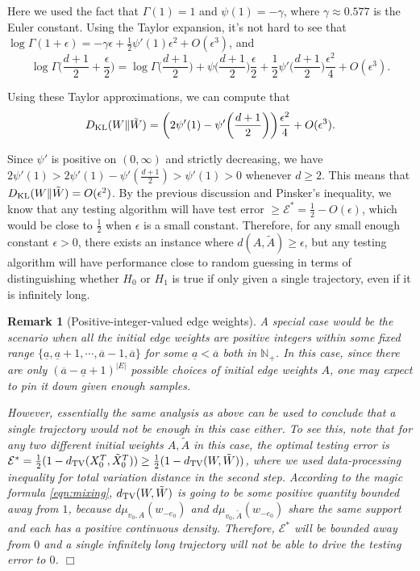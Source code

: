 \documentclass[a4paper, 11pt]{article}
\newcommand{\dkl}{D_{\textnormal{KL}}}
\newcommand{\dtv}{d_{\textnormal{TV}}}
\newtheorem{remark}{Remark}
\begin{document}
Here we used the fact that $\Gamma(1)=1$ and $\psi(1)=-\gamma$, where $\gamma\approx 0.577$ is the Euler constant. Using the Taylor expansion, it's not hard to see that $\log\Gamma(1+\epsilon)=-\gamma \epsilon+\frac{1}{2}\psi'(1)\epsilon^2+O(\epsilon^3)$, and
\[\log\Gamma\Big(\frac{d+1}{2}+\frac{\epsilon}{2}\Big)=\log\Gamma\Big(\frac{d+1}{2}\Big)+\psi\Big(\frac{d+1}{2}\Big) \frac{\epsilon}{2} + \frac{1}{2}\psi'\Big(\frac{d+1}{2}\Big) \frac{\epsilon^2}{4} +O(\epsilon^3).\]

Using these Taylor approximations, we can compute that
\[\dkl(W\|\tilde{W})
= \bigg(2\psi'(1)-\psi'\bigg(\frac{d+1}{2}\bigg)\bigg)\frac{\epsilon^2}{4}+O(\epsilon^3).\]

Since $\psi'$ is positive on $(0,\infty)$ and strictly decreasing, we have $2\psi'(1)> 2\psi'(1)-\psi'(\frac{d+1}{2})> \psi'(1)>0$ whenever $d\geq 2$. This means that $\dkl(W\|\tilde{W})= O(\epsilon^2)$. By the previous discussion and Pinsker's inequality, we know that any testing algorithm will have test error $\geq \mathcal{E}^*= \frac{1}{2}-O(\epsilon)$, which would be close to $\frac{1}{2}$ when $\epsilon$ is a small constant. Therefore, for any small enough constant $\epsilon>0$, there exists an instance where $d(A,\tilde{A})\geq \epsilon$, but any testing algorithm will have performance close to random guessing in terms of distinguishing whether $H_0$ or $H_1$ is true if only given a single trajectory, even if it is infinitely long.

\begin{remark}[Positive-integer-valued edge weights]
A special case would be the scenario when all the initial edge weights are positive integers within some fixed range $\{\underline{a}, \underline{a}+1, \cdots, \overline{a}-1, \overline{a}\}$ for some $\underline{a}<\overline{a}$ both in $\mathbb{N}_+$. In this case, since there are only $(\overline{a}-\underline{a}+1)^{|E|}$ possible choices of initial edge weights $A$, one may expect to pin it down given enough samples. 

However, essentially the same analysis as above can be used to conclude that a single trajectory would not be enough in this case either. To see this, note that for any two different initial weights $A, \tilde{A}$ in this case, the optimal testing error is $\mathcal{E}^*=\frac{1}{2}(1-\dtv(X_0^T, \tilde{X}_0^T))\geq \frac{1}{2}(1-\dtv(W, \tilde{W}))$, where we used data-processing inequality for total variation distance in the second step. According to the magic formula \cref{eqn:mixing}, $\dtv(W, \tilde{W})$ is going to be some positive quantity bounded away from $1$, because $d\mu_{v_0,A}(w_{-{e_0}})$ and $d\mu_{v_0,\tilde{A}}(w_{-{e_0}})$ share the same support and each has a positive continuous density. Therefore, $\mathcal{E}^*$ will be bounded away from $0$ and a single infinitely long trajectory will not be able to drive the testing error to $0$.
\hfill $\Box$
\end{remark}
\end{document}
